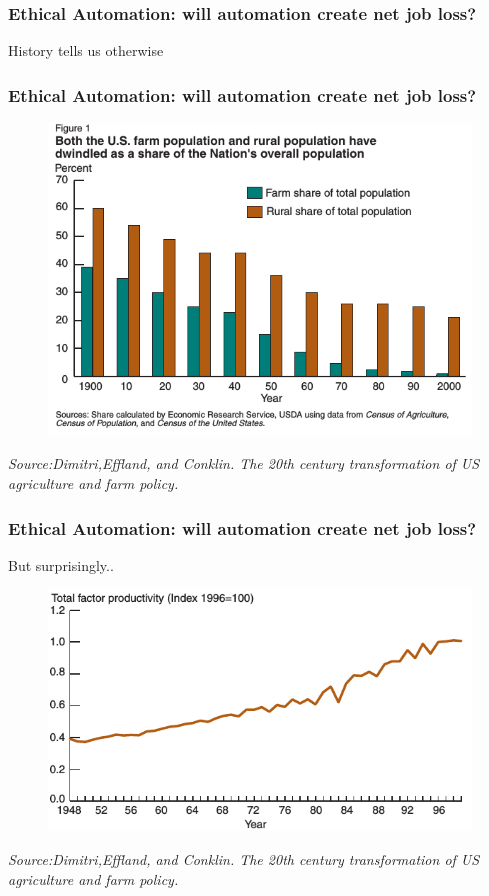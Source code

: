 \begin{frame}
  \frametitle{ Ethical Automation: will automation create net job loss?}
  {\Large History tells us otherwise}
\end{frame}

\begin{frame}
	\frametitle{Ethical Automation: will automation create net job loss?}
	
	\begin{figure}[bht]
	\centering
	\includegraphics[scale=0.5]{diagrams/agriculture-data}
	\end{figure}
	\textit{Source:Dimitri,Effland, and Conklin. The 20th century transformation of US agriculture and farm policy.}
	
\end{frame}

\begin{frame}
	\frametitle{Ethical Automation: will automation create net job loss? }
	{\Large But surprisingly..}
	\begin{figure}[bht]
	\centering
	\includegraphics[scale= 0.4]{diagrams/agriculture-production}
	\end{figure}
	\textit{Source:Dimitri,Effland, and Conklin. The 20th century transformation of US agriculture and farm policy.}
\end{frame}

